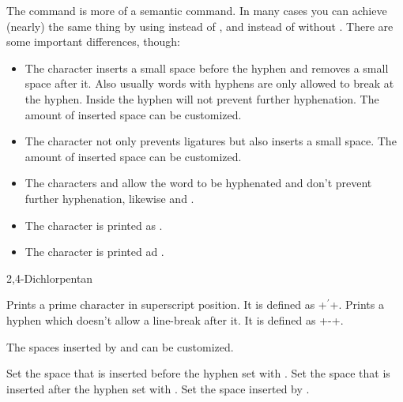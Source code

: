 \documentclass{chemmacros-manual}
\begin{document}
\begin{example}
  \begin{minipage}{.4\linewidth}
  \end{minipage}
\end{example}

The  command is more of a semantic command.  In many cases you can
achieve (nearly) the same thing by using \cs*{-} instead of \sym{\textbar},
and  instead of \sym{\textasciicircum} without
.  There are some important differences, though:
\begin{itemize}
  \item The character \sym{-} inserts a small space before the hyphen and
    removes a small space after it.  Also usually words with hyphens are only
    allowed to break at the hyphen.  Inside  the hyphen will not
    prevent further hyphenation.  The amount of inserted space can be
    customized.
  \item The character \sym{\textbar} not only prevents ligatures but also
    inserts a small space.  The amount of inserted space can be customized.
  \item The characters \sym{(} and \sym{)} allow the word to be hyphenated and
    don't prevent further hyphenation, likewise \sym{[} and \sym{]}.
  \item {}The character  is printed as .
  \item {}The character \sym{=} is printed ad
    .
\end{itemize}
\begin{example}
  \huge{} \par
  2,4-Dichlorpentan
\end{example}
\begin{commands}
    Prints a prime character in superscript position.  It is
    defined as \verbcode+\ensuremath{{}^{\prime}}+.
    Prints a hyphen which doesn't allow a line-break after
    it.  It is defined as \verbcode+\mbox{-}\nobreak\hspace{0pt}+.
\end{commands}

The spaces inserted by \sym{-} and \sym{\textbar} can be
customized.
\begin{options}
  \Initial{.01em}
    Set the space that is inserted before the hyphen set with \sym{-}.
  \Initial{-.03em}
    Set the space that is inserted after the hyphen set with \sym{-}.
  \Initial{.01em}
    Set the space inserted by \sym{\textbar}.
\end{options}
\end{document}
